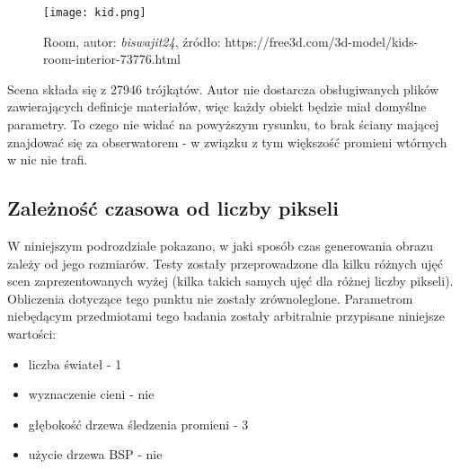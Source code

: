 \begin{figure}[H]
\centering
  \texttt{[image: kid.png]}
  \caption{Room, autor: \emph{biswajit24}, źródło: https://free3d.com/3d-model/kids-room-interior-73776.html}
\end{figure}

Scena składa się z 27946 trójkątów. Autor nie dostarcza obsługiwanych plików zawierających definicje materiałów, więc każdy obiekt będzie miał domyślne parametry. To czego nie widać na powyższym rysunku, to brak ściany mającej znajdować się za obserwatorem - w związku z tym większość promieni wtórnych w nic nie trafi.


\subsection{Zależność czasowa od liczby pikseli}

W niniejszym podrozdziale pokazano, w jaki sposób czas generowania obrazu zależy od jego rozmiarów. Testy zostały przeprowadzone dla kilku różnych ujęć scen zaprezentowanych wyżej (kilka takich samych ujęć dla różnej liczby pikseli). Obliczenia dotyczące tego punktu nie zostały zrównoleglone. Parametrom niebędącym przedmiotami tego badania zostały arbitralnie przypisane niniejsze wartości:

\begin{itemize}

\item liczba świateł - 1
\item wyznaczenie cieni - nie
\item głębokość drzewa śledzenia promieni - 3
\item użycie drzewa BSP - nie

\end{itemize}

